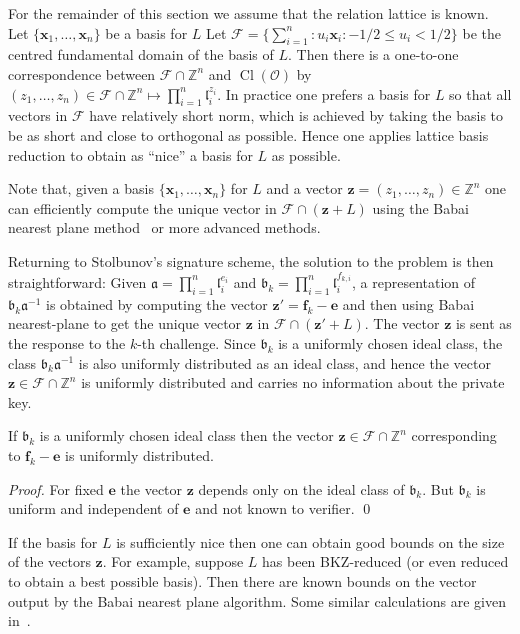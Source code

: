 \documentclass{llncs}
\newcommand{\FF}{\mathcal{F}}
\newcommand{\OO}{\mathcal{O}}
\newcommand{\Z}{\mathbb{Z}}
\DeclareMathOperator{\Cl}{Cl}
\renewcommand{\a}{\mathfrak{a}}
\renewcommand{\b}{\mathfrak{b}}
\renewcommand{\l}{\mathfrak{l}}
\newcommand{\e}{\mathbf{e}}
\newcommand{\f}{\mathbf{f}}
\newcommand{\x}{\mathbf{x}}
\newcommand{\z}{\mathbf{z}}
\begin{document}
For the remainder of this section we assume that the relation lattice is known.
Let $\{ \x_1, \dots, \x_n \}$ be a basis for $L$
Let $\FF = \{ \sum_{i=1}^n : u_i \x_i : -1/2 \le u_i < 1/2 \}$ be the centred fundamental domain of the basis of $L$.
Then there is a one-to-one correspondence between $\FF \cap \Z^n$ and $\Cl(\OO)$ by
$(z_1, \dots, z_n ) \in \FF \cap \Z^n  \mapsto \prod_{i=1}^n \l_i^{z_i}$.
In practice one prefers a basis for $L$ so that all vectors in $\FF$ have relatively short norm, which is achieved by taking the basis to be as short and close to orthogonal as possible. Hence one applies lattice basis reduction to obtain as ``nice'' a basis for $L$ as possible.

Note that, given a basis $\{ \x_1, \dots, \x_n \}$ for $L$ and a vector $\z = (z_1, \dots, z_n ) \in \Z^n$ one can efficiently compute the unique vector in $\FF \cap (\z + L )$ using the Babai nearest plane method~\cite{Bab86} or more advanced methods.



Returning to Stolbunov's signature scheme, the solution to the problem is then straightforward:
Given $\a = \prod_{i=1}^n \l_i^{e_i}$ and $\b_k = \prod_{i=1}^n \l_i^{f_{k,i}}$,
a representation of $\b_k \a^{-1}$ is obtained by computing the vector $\z' = \f_k - \e$
and then using Babai nearest-plane to get the unique vector $\z$ in $\FF \cap (\z' + L )$.
The vector $\z$ is sent as the response to the $k$-th challenge.
Since $\b_k$ is a uniformly chosen ideal class, the class $\b_k \a^{-1}$ is also uniformly distributed as an ideal class, and hence the vector $\z \in \FF \cap \Z^n$ is uniformly distributed and carries no information about the private key.

\begin{lemma}
If $\b_k$ is a uniformly chosen ideal class then the vector 
$\z \in \FF \cap \Z^n$ corresponding to $\f_k - \e$ is uniformly distributed.
\end{lemma}

\begin{proof}
For fixed $\e$ the vector $\z$ depends only on the ideal class of $\b_k$.
But $\b_k$ is uniform and independent of $\e$ and not known to verifier. \qed
\end{proof}



If the basis for $L$ is sufficiently nice then one can obtain good bounds on the size of the vectors $\z$.
For example, suppose $L$ has been BKZ-reduced (or even reduced to obtain a best possible basis).
Then there are known bounds on the vector output by the Babai nearest plane algorithm.
Some similar calculations are given in~\cite{BS18}.
\end{document}
